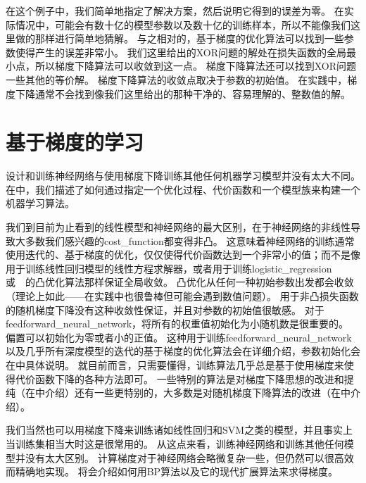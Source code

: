 在这个例子中，我们简单地指定了解决方案，然后说明它得到的误差为零。
在实际情况中，可能会有数十亿的模型参数以及数十亿的训练样本，所以不能像我们这里做的那样进行简单地猜解。
与之相对的，基于梯度的优化算法可以找到一些参数使得产生的误差非常小。
我们这里给出的XOR问题的解处在损失函数的全局最小点，所以梯度下降算法可以收敛到这一点。
梯度下降算法还可以找到XOR问题一些其他的等价解。
梯度下降算法的收敛点取决于参数的初始值。
在实践中，梯度下降通常不会找到像我们这里给出的那种干净的、容易理解的、整数值的解。

\section{基于梯度的学习}
\label{sec:gradient_based_learning}

设计和训练神经网络与使用梯度下降训练其他任何机器学习模型并没有太大不同。
在中，我们描述了如何通过指定一个优化过程、代价函数和一个模型族来构建一个机器学习算法。

我们到目前为止看到的线性模型和神经网络的最大区别，在于神经网络的非线性导致大多数我们感兴趣的\gls{cost_function}都变得非凸。
这意味着神经网络的训练通常使用迭代的、基于梯度的优化，仅仅使得代价函数达到一个非常小的值；而不是像用于训练线性回归模型的线性方程求解器，或者用于训练\gls{logistic_regression}或~~的凸优化算法那样保证全局收敛。
凸优化从任何一种初始参数出发都会收敛（理论上如此——在实践中也很鲁棒但可能会遇到数值问题）。
用于非凸损失函数的随机梯度下降没有这种收敛性保证，并且对参数的初始值很敏感。
对于\gls{feedforward_neural_network}，将所有的权重值初始化为小随机数是很重要的。
偏置可以初始化为零或者小的正值。
这种用于训练\gls{feedforward_neural_network}以及几乎所有深度模型的迭代的基于梯度的优化算法会在详细介绍，参数初始化会在中具体说明。
就目前而言，只需要懂得，训练算法几乎总是基于使用梯度来使得代价函数下降的各种方法即可。
一些特别的算法是对梯度下降思想的改进和提纯（在中介绍）还有一些更特别的，大多数是对随机梯度下降算法的改进（在中介绍）。


我们当然也可以用梯度下降来训练诸如线性回归和\gls{SVM}之类的模型，并且事实上当训练集相当大时这是很常用的。
从这点来看，训练神经网络和训练其他任何模型并没有太大区别。
计算梯度对于神经网络会略微复杂一些，但仍然可以很高效而精确地实现。
将会介绍如何用\gls{BP}算法以及它的现代扩展算法来求得梯度。

